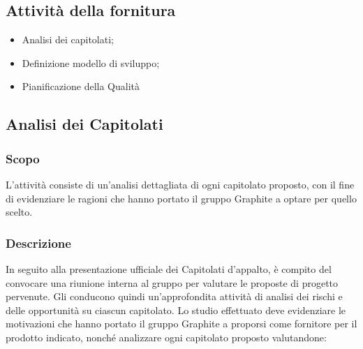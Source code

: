 \documentclass[../NormediProgetto.tex]{subfiles}
\begin{document}
\subsection{Attività della fornitura}
\begin{itemize}
	\item Analisi dei capitolati;
	
	\item Definizione modello di sviluppo; 
	
	\item Pianificazione della Qualità
\end{itemize}


\subsection{Analisi dei Capitolati}
\subsubsection{Scopo}

L'attività consiste di un'analisi dettagliata di ogni capitolato proposto, con il fine di evidenziare le ragioni che hanno portato il gruppo Graphite a optare per quello scelto.

\subsubsection{Descrizione} 
In seguito alla presentazione ufficiale dei Capitolati d'appalto, è compito del  convocare una riunione interna al gruppo per valutare le proposte di progetto pervenute. Gli  conducono quindi un'approfondita attività di analisi dei rischi e delle opportunità su ciascun capitolato.
Lo studio effettuato deve evidenziare le motivazioni che hanno portato il gruppo Graphite a proporsi come fornitore per il prodotto indicato, nonché analizzare ogni capitolato proposto valutandone:
 
\end{document}
